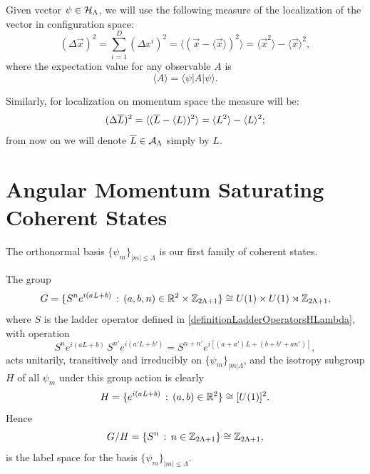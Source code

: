 Given vector $\psi \in \mathcal H_\Lambda$, we will use the following measure of the localization of the vector in configuration space:
\begin{equation}
    (\Delta \vec x)^2 = \sum_{i = 1}^D (\Delta x^i)^2 = \langle (\vec x - \langle \vec x \rangle)^2 \rangle = \langle \vec x^2 \rangle - \langle \vec x \rangle ^2,
\end{equation}
where the expectation value for any observable $A$ is
\begin{equation}
    \langle A \rangle = \langle \psi | A | \psi \rangle.
\end{equation}

Similarly, for localization on momentum space the measure will be:
\begin{equation}
    (\Delta \overline{L})^2 = \langle (\overline{L} - \langle L \rangle )^2 \rangle = \langle L^2 \rangle - \langle L \rangle ^2;
\end{equation}
from now on we will denote $\overline{L} \in \mathcal A_{\Lambda}$ simply by $L$.

\section{Angular Momentum Saturating Coherent States}

The orthonormal basis $\{\psi_m\}_{|m| \leq \Lambda}$ is our first family of coherent states. 

The group 
\begin{equation}
    G = \{S^n e^{i(aL + b)} \,:\, (a, b, n) \in \mathbb{R}^2 \times \mathbb{Z}_{2\Lambda + 1}\} \cong U(1) \times U(1) \rtimes \mathbb{Z}_{2\Lambda + 1},
\end{equation}
where $S$ is the ladder operator defined in \ref{definitionLadderOperatorsHLambda}, with operation
\begin{equation*}
    S^n e^{i(aL+b)}\, S^{n'}e^{i(a'L+b')} = S^{n + n'} e^{i[(a+a')L + (b + b' + an')]},
\end{equation*}
acts unitarily, transitively and irreducibly on $\{\psi_m\}_{|m|\Lambda}$, and the isotropy subgroup $H$ of all $\psi_m$ under this group action is clearly
\begin{equation}
    H = \{e^{i(aL+b)} \,:\, (a, b) \in \mathbb{R}^2 \} \cong [U(1)]^2.
\end{equation}
Hence 
\begin{equation}
    G/H = \{S^n \,:\, n \in \mathbb{Z}_{2\Lambda + 1}\} \cong \mathbb{Z}_{2\Lambda + 1},
\end{equation}
is the label space for the basis $\{\psi_m\}_{|m|\leq \Lambda}$. 

